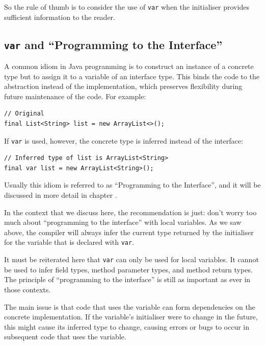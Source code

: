 So the rule of thumb is to consider the use of \lstinline|var| when the initialiser provides sufficient information to the reader.


\subsection{\lstinline|var| and “Programming to the Interface”}
A common idiom in Java programming is to construct an instance of a concrete type but to assign it to a variable of an interface type. This binds the code to the abstraction instead of the implementation, which preserves flexibility during future maintenance of the code. For example:
\begin{lstlisting}
// Original
final List<String> list = new ArrayList<>();
\end{lstlisting}
If \lstinline|var| is used, however, the concrete type is inferred instead of the interface:
\begin{lstlisting}
// Inferred type of list is ArrayList<String>
final var list = new ArrayList<String>();
\end{lstlisting}

Usually this idiom is referred to as “Programming to the Interface”, and it will be discussed in more detail in chapter .

In the context that we discuss here, the recommendation is just: don’t worry too much about “programming to the interface” with local variables. As we saw above, the compiler will always infer the current type returned by the initialiser for the variable that is declared with \lstinline|var|.

It must be reiterated here that \lstinline|var| can only be used for local variables. It cannot be used to infer field types, method parameter types, and method return types. The principle of “programming to the interface” is still as important as ever in those contexts.

The main issue is that code that uses the variable can form dependencies on the concrete implementation. If the variable’s initialiser were to change in the future, this might cause its inferred type to change, causing errors or bugs to occur in subsequent code that uses the variable.

